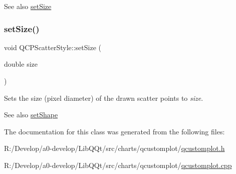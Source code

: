 \begin{DoxySeeAlso}{See also}
\mbox{\hyperlink{class_q_c_p_scatter_style_aaefdd031052892c4136129db68596e0f}{set\+Size}} 
\end{DoxySeeAlso}
\mbox{\label{class_q_c_p_scatter_style_aaefdd031052892c4136129db68596e0f}} 
\subsubsection{\texorpdfstring{set\+Size()}{setSize()}}
{\footnotesize\ttfamily void Q\+C\+P\+Scatter\+Style\+::set\+Size (\begin{DoxyParamCaption}\item[{double}]{size }\end{DoxyParamCaption})}

Sets the size (pixel diameter) of the drawn scatter points to {\itshape size}.

\begin{DoxySeeAlso}{See also}
\mbox{\hyperlink{class_q_c_p_scatter_style_a7c641c4d4c6d29cb705d3887cfce91c1}{set\+Shape}} 
\end{DoxySeeAlso}


The documentation for this class was generated from the following files\+:\begin{DoxyCompactItemize}
\item 
R\+:/\+Develop/a0-\/develop/\+Lib\+Q\+Qt/src/charts/qcustomplot/\mbox{\hyperlink{qcustomplot_8h}{qcustomplot.\+h}}\item 
R\+:/\+Develop/a0-\/develop/\+Lib\+Q\+Qt/src/charts/qcustomplot/\mbox{\hyperlink{qcustomplot_8cpp}{qcustomplot.\+cpp}}\end{DoxyCompactItemize}
